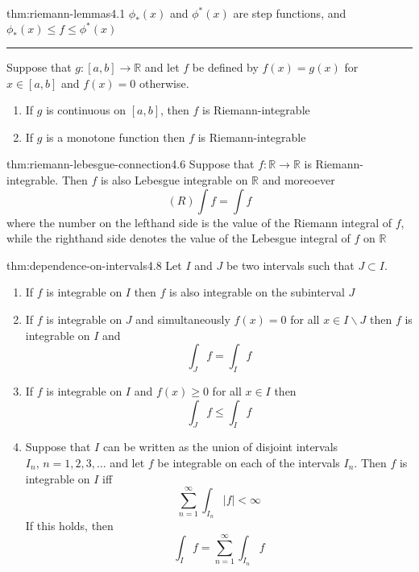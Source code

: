 \documentclass[landscape, 8pt]{extarticle}
\begin{document}
\begin{multicols}{3}
\begin{thm}{thm:riemann-lemmas}{4.1}
	\vspace{-2pt}
	$\phi_{*}(x)$ and $\phi^{*}(x)$ are step functions, and $\phi_{*}(x) \le f \le \phi^{*}(x)$

	\vspace{-3pt}
	\noindent\rule{\textwidth}{0.2pt}
	Suppose that $g : [a, b] \to \mathbb{R}$ and let $f$ be defined by $f(x) = g(x)$ for $x\in [a,b]$ and $f(x) = 0$ otherwise.
	\vspace{-3pt}
	\begin{enumerate}
	    \setlength\itemsep{0em}
	    \item If $g$ is continuous on $[a, b]$, then $f$ is Riemann-integrable
	    \item If $g$ is a monotone function then $f$ is Riemann-integrable
	\end{enumerate}
\end{thm}

\begin{thm}{thm:riemann-lebesgue-connection}{4.6}
	Suppose that $f : \mathbb{R} \to \mathbb{R}$ is Riemann-integrable. Then $f$ is also Lebesgue integrable on $\mathbb{R}$ and moreoever
	\[(R) \int f = \int f\]
	where the number on the lefthand side is the value of the Riemann integral of $f$, while the righthand side denotes the value of the Lebesgue integral of $f$ on $\mathbb{R}$
\end{thm}



\begin{thm}{thm:dependence-on-intervals}{4.8}
	Let $I$ and $J$ be two intervals such that $J \subset I$.
	\begin{enumerate}
	    \item If $f$ is integrable on $I$ then $f$ is also integrable on the subinterval $J$
	    \item If $f$ is integrable on $J$ and simultaneously $f(x) = 0$ for all $x\in I \backslash J$ then $f$ is integrable on $I$ and
			\[\int_{J} f = \int_{I} f\]
		\item If $f$ is integrable on $I$ and $f(x) \ge 0$ for all $x\in I$ then
			\[\int_{J} f \le \int_{I} f\]
		\item Suppose that $I$ can be written as the union of disjoint intervals $I_{n},\, n = 1,2,3,\dots$ and let $f$ be integrable on each of the intervals $I_{n}$. Then $f$ is integrable on $I$ iff
			\[\sum_{n = 1}^{\infty} \int_{I_{n}} \lvert f \rvert < \infty\]
			If this holds, then
			\[\int_{I} f = \sum_{n = 1}^{\infty} \int_{I_{n}} f\]
	\end{enumerate}
\end{thm}



\end{multicols}
\end{document}
